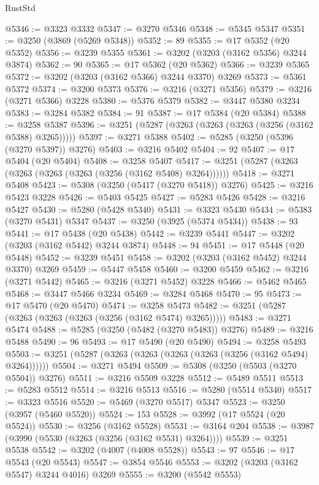 \begin{lexlean}{RustStd}
\begin{coremodule}
@5346 := @3323 @3332
@5347 := @3270 @5346
@5348 := @5345 @5347
@5351 := @3250 (@3869 (@5269 @5348))
@5352 := 89
@5355 := @17 @5352 (@20 @5352)
@5356 := @3239 @5355
@5361 := @3202 (@3203 (@3162 @5356) @3244 @3874)
@5362 := 90
@5365 := @17 @5362 (@20 @5362)
@5366 := @3239 @5365
@5372 := @3202 (@3203 (@3162 @5366) @3244 @3370) @3269
@5373 := @5361 @5372
@5374 := @3200 @5373
@5376 := @3216 (@3271 @5356)
@5379 := @3216 (@3271 @5366) @3228
@5380 := @5376 @5379
@5382 := @3447 @5380 @3234
@5383 := @3284 @5382
@5384 := 91
@5387 := @17 @5384 (@20 @5384)
@5388 := @3258 @5387
@5396 := @3251 (@5287 (@3263 (@3263 (@3263 (@3256 (@3162 @5388) @3265)))))
@5397 := @3271 @5388
@5402 := @5285 (@3250 (@5396 (@3270 @5397)) @3276)
@5403 := @3216 @5402
@5404 := 92
@5407 := @17 @5404 (@20 @5404)
@5408 := @3258 @5407
@5417 := @3251 (@5287 (@3263 (@3263 (@3263 (@3263 (@3256 (@3162 @5408) @3264))))))
@5418 := @3271 @5408
@5423 := @5308 (@3250 (@5417 (@3270 @5418)) @3276)
@5425 := @3216 @5423 @3228
@5426 := @5403 @5425
@5427 := @5283 @5426
@5428 := @3216 @5427
@5430 := @5280 (@5428 @5340)
@5431 := @3323 @5430
@5434 := @5383 (@3270 @5431) @5347
@5437 := @3250 (@3925 (@5374 @5434))
@5438 := 93
@5441 := @17 @5438 (@20 @5438)
@5442 := @3239 @5441
@5447 := @3202 (@3203 (@3162 @5442) @3244 @3874)
@5448 := 94
@5451 := @17 @5448 (@20 @5448)
@5452 := @3239 @5451
@5458 := @3202 (@3203 (@3162 @5452) @3244 @3370) @3269
@5459 := @5447 @5458
@5460 := @3200 @5459
@5462 := @3216 (@3271 @5442)
@5465 := @3216 (@3271 @5452) @3228
@5466 := @5462 @5465
@5468 := @3447 @5466 @3234
@5469 := @3284 @5468
@5470 := 95
@5473 := @17 @5470 (@20 @5470)
@5474 := @3258 @5473
@5482 := @3251 (@5287 (@3263 (@3263 (@3263 (@3256 (@3162 @5474) @3265)))))
@5483 := @3271 @5474
@5488 := @5285 (@3250 (@5482 (@3270 @5483)) @3276)
@5489 := @3216 @5488
@5490 := 96
@5493 := @17 @5490 (@20 @5490)
@5494 := @3258 @5493
@5503 := @3251 (@5287 (@3263 (@3263 (@3263 (@3263 (@3256 (@3162 @5494) @3264))))))
@5504 := @3271 @5494
@5509 := @5308 (@3250 (@5503 (@3270 @5504)) @3276)
@5511 := @3216 @5509 @3228
@5512 := @5489 @5511
@5513 := @5283 @5512
@5514 := @3216 @5513
@5516 := @5280 (@5514 @5340)
@5517 := @3323 @5516
@5520 := @5469 (@3270 @5517) @5347
@5523 := @3250 (@3957 (@5460 @5520))
@5524 := 153
@5528 := @3992 (@17 @5524 (@20 @5524))
@5530 := @3256 (@3162 @5528)
@5531 := @3164 @204
@5538 := @3987 (@3990 (@5530 (@3263 (@3256 (@3162 @5531) @3264))))
@5539 := @3251 @5538
@5542 := @3202 (@4007 (@4008 @5528))
@5543 := 97
@5546 := @17 @5543 (@20 @5543)
@5547 := @3854 @5546
@5553 := @3202 (@3203 (@3162 @5547) @3244 @4016) @3269
@5555 := @3200 (@5542 @5553)

\end{coremodule}
\end{lexlean}
